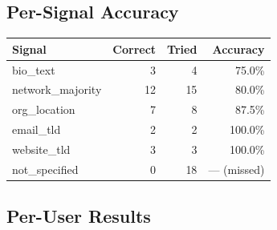 \documentclass[11pt,a4paper]{article}
\begin{document}
\vspace{8pt}

\subsection*{Per-Signal Accuracy}

\begin{tabular}{lrrr}
\toprule
\textbf{Signal} & \textbf{Correct} & \textbf{Tried} & \textbf{Accuracy} \\
\midrule
bio\_text          & 3 & 4  & 75.0\% \\
network\_majority  & 12 & 15 & 80.0\% \\
org\_location      & 7 & 8  & 87.5\% \\
email\_tld         & 2 & 2  & 100.0\% \\
website\_tld       & 3 & 3  & 100.0\% \\
\midrule
not\_specified     & 0 & 18 & — (missed) \\
\bottomrule
\end{tabular}

\vspace{8pt}

\subsection*{Per-User Results}
\end{document}
